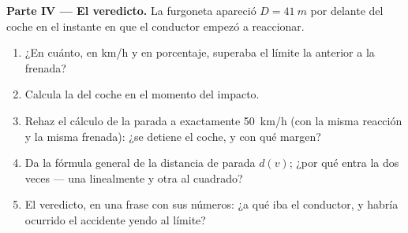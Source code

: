 \begin{problem}
\medskip
\noindent\textbf{Parte IV --- El veredicto.}
La furgoneta apareció $D = \qty{41}{m}$ por delante del coche en el
instante en que el conductor empezó a reaccionar.
\begin{enumerate}[resume]
  \item ¿En cuánto, en \unit{km/h} y en porcentaje, superaba el límite
        la  anterior a la frenada?
  \item Calcula la  del coche en el momento del impacto.
  \item Rehaz el cálculo de la parada a exactamente \qty{50}{km/h} (con
        la misma reacción y la misma frenada): ¿se detiene el coche, y
        con qué margen?
  \item Da la fórmula general de la distancia de parada $d(v)$; ¿por qué
        entra la  dos veces --- una linealmente y otra al
        cuadrado?
  \item El veredicto, en una frase con sus números: ¿a qué  iba
        el conductor, y habría ocurrido el accidente yendo al límite?
\end{enumerate}
\end{problem}

